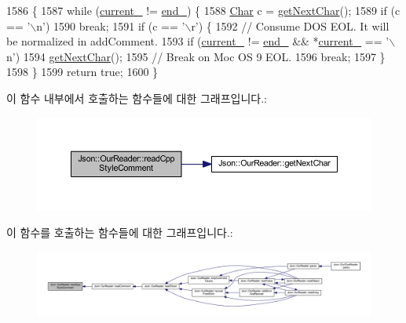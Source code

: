 \begin{DoxyCode}
1586                                     \{
1587   \textcolor{keywordflow}{while} (\hyperlink{class_json_1_1_our_reader_a5211fbbba94be80a22dd2317c621efcc}{current\_} != \hyperlink{class_json_1_1_our_reader_ab1f69b0260c27a0d2d65dc56e42c8f9d}{end\_}) \{
1588     \hyperlink{class_json_1_1_our_reader_a0cd0bab4caa66594ab843ccd5f9dc239}{Char} c = \hyperlink{class_json_1_1_our_reader_a298285d035fdbc554caae09d9f0a5859}{getNextChar}();
1589     \textcolor{keywordflow}{if} (c == \textcolor{charliteral}{'\(\backslash\)n'})
1590       \textcolor{keywordflow}{break};
1591     \textcolor{keywordflow}{if} (c == \textcolor{charliteral}{'\(\backslash\)r'}) \{
1592       \textcolor{comment}{// Consume DOS EOL. It will be normalized in addComment.}
1593       \textcolor{keywordflow}{if} (\hyperlink{class_json_1_1_our_reader_a5211fbbba94be80a22dd2317c621efcc}{current\_} != \hyperlink{class_json_1_1_our_reader_ab1f69b0260c27a0d2d65dc56e42c8f9d}{end\_} && *\hyperlink{class_json_1_1_our_reader_a5211fbbba94be80a22dd2317c621efcc}{current\_} == \textcolor{charliteral}{'\(\backslash\)n'})
1594         \hyperlink{class_json_1_1_our_reader_a298285d035fdbc554caae09d9f0a5859}{getNextChar}();
1595       \textcolor{comment}{// Break on Moc OS 9 EOL.}
1596       \textcolor{keywordflow}{break};
1597     \}
1598   \}
1599   \textcolor{keywordflow}{return} \textcolor{keyword}{true};
1600 \}
\end{DoxyCode}
이 함수 내부에서 호출하는 함수들에 대한 그래프입니다.\+:\nopagebreak
\begin{figure}[H]
\begin{center}
\leavevmode
\includegraphics[width=350pt]{class_json_1_1_our_reader_ae3de80671f0f997053e1c1c8a47a45c5_cgraph}
\end{center}
\end{figure}
이 함수를 호출하는 함수들에 대한 그래프입니다.\+:\nopagebreak
\begin{figure}[H]
\begin{center}
\leavevmode
\includegraphics[width=350pt]{class_json_1_1_our_reader_ae3de80671f0f997053e1c1c8a47a45c5_icgraph}
\end{center}
\end{figure}
\mbox{\label{class_json_1_1_our_reader_aba784b125baa1b62387e767b791f2f89}} 
